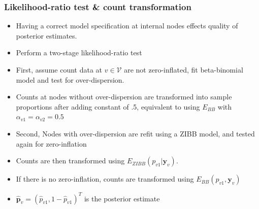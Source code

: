 \documentclass{beamer}
\begin{document}
\begin{frame}
\frametitle{Likelihood-ratio test \& count transformation}
\begin{itemize}
  \item Having a correct model specification at internal nodes effects quality of posterior estimates.
  \item Perform a two-stage likelihood-ratio test
  \item First, assume count data at $v \in \mathcal{V}$ are not zero-inflated, fit beta-binomial model and test for over-dispersion.
  \item Counts at nodes without over-dispersion are transformed into sample proportions after adding constant of .5, equivalent to using $E_{BB}$ with $\alpha_{v1} = \alpha_{v2} = 0.5$
  \item Second, Nodes with over-dispersion are refit using a ZIBB model, and tested again for zero-inflation
  \item Counts are then transformed using $E_{ZIBB}(p_{v1}|\boldsymbol y_v)$.
  \item If there is no zero-inflation,  counts are transformed using $E_{BB}(p_{v1}, \boldsymbol y_v)$
  \item $\hat{\boldsymbol p}_v = (\hat p_{v1}, 1 - \hat{p}_{v1})^T$ is the posterior estimate

\end{itemize}
\end{frame}
\end{document}
